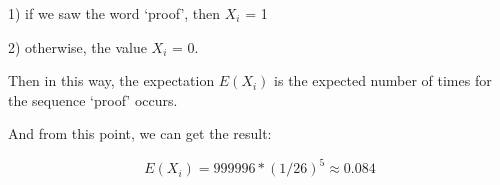\documentclass{article}
\begin{document}
1) if we saw the word `proof', then $X_i$ = 1

2) otherwise, the value $X_i$ = 0.

Then in this way, the expectation $E(X_i)$ is the expected number of times for the sequence `proof' occurs. 

And from this point, we can get the result:

$$E(X_i) = 999996 * (1/26)^5 \approx 0.084$$

~\\ %
\end{document}
